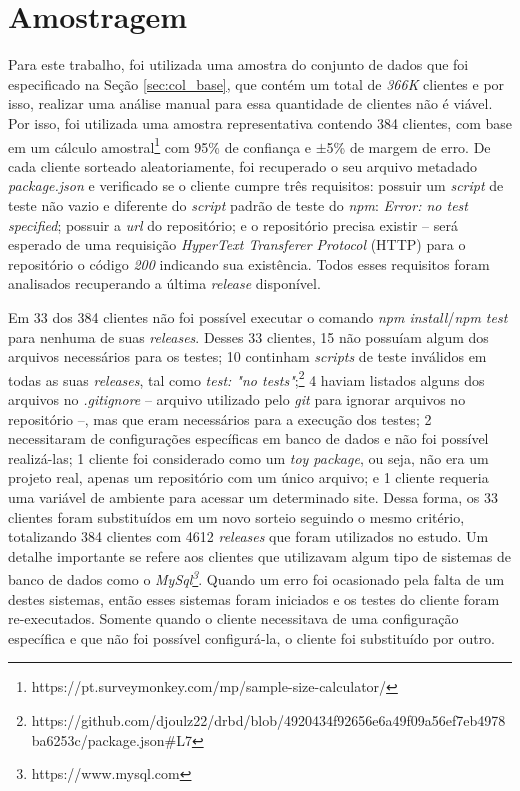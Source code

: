 \section{Amostragem}
\label{sec:col_amostra}
Para este trabalho, foi utilizada uma amostra do conjunto de dados que foi especificado na Seção \ref{sec:col_base}, que contém um total de \textit{366K} clientes e por isso, realizar uma análise manual para essa quantidade de clientes não é viável. Por isso, foi utilizada uma amostra representativa contendo 384 clientes, com base em um cálculo amostral\footnote{https://pt.surveymonkey.com/mp/sample-size-calculator/} com 95\% de confiança e $\pm$5\% de margem de erro. De cada cliente sorteado aleatoriamente, foi recuperado o seu arquivo metadado \textit{package.json} e verificado se o cliente cumpre três requisitos: possuir um \textit{script} de teste não vazio e diferente do \textit{script} padrão de teste do \textit{npm}: \textit{Error: no test specified}; possuir a \textit{url} do repositório; e o repositório precisa existir -- será esperado de uma requisição \textit{HyperText Transferer Protocol} (HTTP) para o repositório o código \textit{200} indicando sua existência. Todos esses requisitos foram analisados recuperando a última \textit{release} disponível.

Em 33 dos 384 clientes não foi possível executar o comando \textit{npm install}/\textit{npm test} para nenhuma de suas \textit{releases}. Desses 33 clientes, 15 não possuíam algum dos arquivos necessários para os testes; 10 continham \textit{scripts} de teste inválidos em todas as suas \textit{releases}, tal como \textit{test: "no tests"};\footnote{https://github.com/djoulz22/drbd/blob/4920434f92656e6a49f09a56ef7eb4978ba6253c/package.json\#L7} 4 haviam listados alguns dos arquivos no \textit{.gitignore} -- arquivo utilizado pelo \textit{git} para ignorar arquivos no repositório --, mas que eram necessários para a execução dos testes; 2 necessitaram de configurações específicas em banco de dados e não foi possível realizá-las; 1 cliente foi considerado como um \textit{toy package}, ou seja, não era um projeto real, apenas um repositório com um único arquivo; e 1 cliente requeria uma variável de ambiente para acessar um determinado site. Dessa forma, os 33 clientes foram substituídos em um novo sorteio seguindo o mesmo critério, totalizando 384 clientes com 4612 \textit{releases} que foram utilizados no estudo. Um detalhe importante se refere aos clientes que utilizavam algum tipo de sistemas de banco de dados como o \textit{MySql\footnote{https://www.mysql.com}}. Quando um erro foi ocasionado pela falta de um destes sistemas, então esses sistemas foram iniciados e os testes do cliente foram re-executados. Somente quando o cliente necessitava de uma configuração específica e que não foi possível configurá-la, o cliente foi substituído por outro.

